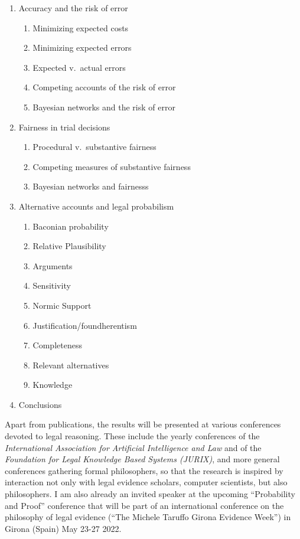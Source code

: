 \documentclass[11pt,dvipsnames,enabledeprecatedfontcommands]{scrartcl}
\begin{document}
\begin{multicols}{2}
\begin{enumerate}
\begin{enumerate}
  \item  Accuracy and the risk of error
  \begin{enumerate}
  \item  Minimizing expected costs
  \item  Minimizing expected errors
  \item  Expected v.\ actual errors
  \item  Competing accounts of the risk of error
  \item  Bayesian networks and the risk of error
  \end{enumerate}



  \item  Fairness in trial decisions
  \begin{enumerate}
  \item  Procedural v.\ substantive fairness
  \item  Competing measures of substantive fairness
  \item  Bayesian networks and fairnesss
  \end{enumerate}


  \item  Alternative accounts and legal probabilism
  \begin{enumerate}
  \item  Baconian probability
  \item  Relative Plausibility
  \item  Arguments
  \item  Sensitivity
  \item  Normic Support
  \item  Justification/foundherentism
  \item  Completeness
  \item  Relevant alternatives
  \item  Knowledge
  \end{enumerate}

\item Conclusions
\end{enumerate}
\end{enumerate}
\normalsize
\end{multicols}

Apart from publications, the results will be presented at various
conferences devoted to legal reasoning. These include the yearly
conferences of the
\emph{International Association for Artificial Intelligence and Law} and
of the \emph{Foundation for Legal Knowledge Based Systems (JURIX)}, and
more general conferences gathering formal philosophers, so that the
research is inspired by interaction not only with legal evidence
scholars, computer scientists, but also philosophers. I am also already
an invited speaker at the upcoming ``Probability and Proof'' conference
that will be part of an international conference on the philosophy of
legal evidence (``The Michele Taruffo Girona Evidence Week'') in Girona
(Spain) May 23-27 2022.
\end{document}
